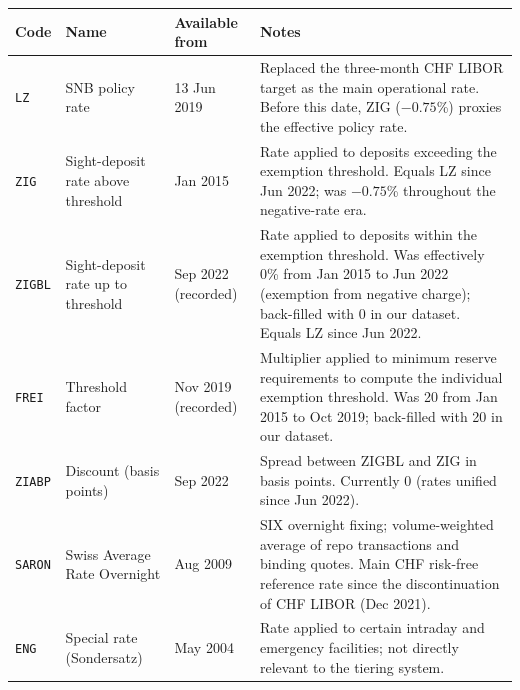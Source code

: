 \documentclass[12pt,a4paper]{article}
\begin{document}
\begin{longtable}{L{2.2cm} L{4.5cm} L{2.5cm} L{5.3cm}}
  \toprule
  \textbf{Code} & \textbf{Name} & \textbf{Available from} & \textbf{Notes} \\
  \midrule
  \endhead
  \bottomrule
  \endfoot
  \texttt{LZ}    & SNB policy rate
                 & 13 Jun 2019
                 & Replaced the three-month CHF LIBOR target as the main
                   operational rate.  Before this date, ZIG ($-0.75$\%)
                   proxies the effective policy rate. \\[4pt]
  \texttt{ZIG}   & Sight-deposit rate above threshold
                 & Jan 2015
                 & Rate applied to deposits exceeding the exemption threshold.
                   Equals LZ since Jun 2022; was $-0.75$\% throughout the
                   negative-rate era. \\[4pt]
  \texttt{ZIGBL} & Sight-deposit rate up to threshold
                 & Sep 2022 (recorded)
                 & Rate applied to deposits within the exemption threshold.
                   Was effectively 0\% from Jan 2015 to Jun 2022 (exemption
                   from negative charge); back-filled with 0 in our dataset.
                   Equals LZ since Jun 2022. \\[4pt]
  \texttt{FREI}  & Threshold factor
                 & Nov 2019 (recorded)
                 & Multiplier applied to minimum reserve requirements to
                   compute the individual exemption threshold.  Was 20 from
                   Jan 2015 to Oct 2019; back-filled with 20 in our dataset. \\[4pt]
  \texttt{ZIABP} & Discount (basis points)
                 & Sep 2022
                 & Spread between ZIGBL and ZIG in basis points.
                   Currently 0 (rates unified since Jun 2022). \\[4pt]
  \texttt{SARON} & Swiss Average Rate Overnight
                 & Aug 2009
                 & SIX overnight fixing; volume-weighted average of repo
                   transactions and binding quotes.  Main CHF risk-free
                   reference rate since the discontinuation of CHF LIBOR
                   (Dec 2021). \\[4pt]
  \texttt{ENG}   & Special rate (Sondersatz)
                 & May 2004
                 & Rate applied to certain intraday and emergency facilities;
                   not directly relevant to the tiering system. \\
\end{longtable}
\end{document}
